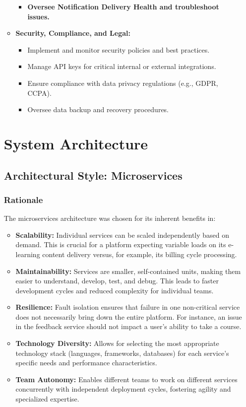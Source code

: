 \documentclass[12pt, a4paper]{report} %
\begin{document}
\begin{itemize}
\begin{itemize}
\begin{itemize}
            \item \textbf{Oversee Notification Delivery Health and troubleshoot issues.}
        \end{itemize}
    \item \textbf{Security, Compliance, and Legal:}
        \begin{itemize}
            \item Implement and monitor security policies and best practices.
            \item Manage API keys for critical internal or external integrations.
            \item Ensure compliance with data privacy regulations (e.g., GDPR, CCPA).
            \item Oversee data backup and recovery procedures.
        \end{itemize}
  \end{itemize}

\chapter{System Architecture}
\section{Architectural Style: Microservices}
  \subsection{Rationale}
    The microservices architecture was chosen for its inherent benefits in:
    \begin{itemize}
        \item \textbf{Scalability:} Individual services can be scaled independently based on demand. This is crucial for a platform expecting variable loads on its e-learning content delivery versus, for example, its billing cycle processing.
        \item \textbf{Maintainability:} Services are smaller, self-contained units, making them easier to understand, develop, test, and debug. This leads to faster development cycles and reduced complexity for individual teams.
        \item \textbf{Resilience:} Fault isolation ensures that failure in one non-critical service does not necessarily bring down the entire platform. For instance, an issue in the feedback service should not impact a user's ability to take a course.
        \item \textbf{Technology Diversity:} Allows for selecting the most appropriate technology stack (languages, frameworks, databases) for each service's specific needs and performance characteristics.
        \item \textbf{Team Autonomy:} Enables different teams to work on different services concurrently with independent deployment cycles, fostering agility and specialized expertise.
    \end{itemize}


\end{itemize}
\end{document}
